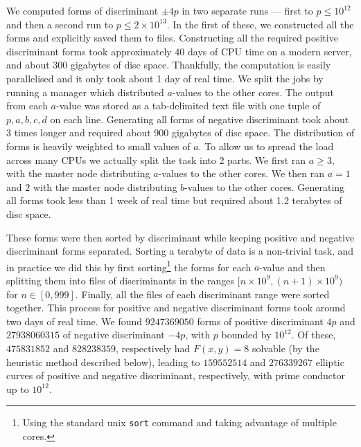 We computed forms of discriminant $\pm 4p$ in two separate runs --- first to $p\leq 10^{12}$ and then a second run to $p 
\leq 2\times 10^{13}$. In the first of these, we constructed all the forms and explicitly saved them to files. 
Constructing all the required positive discriminant forms took approximately 40 days of CPU time on a modern server, and 
about 300 gigabytes of disc space. Thankfully, the computation is easily parallelised and it only took about 1 day of 
real time. We split the jobs by running a manager which distributed $a$-values to the other cores. The output from each 
$a$-value was stored as a tab-delimited text file with one tuple of $p,a,b,c,d$ on each line. Generating all forms of 
negative discriminant took about 3 times longer and required about 900 gigabytes of disc space. The distribution of 
forms is heavily weighted to small values of $a$. To allow us to spread the load across many CPUs we actually split the 
task into 2 parts. We first ran $a \geq 3$, with the master node distributing $a$-values to the other cores. We then ran 
$a=1$ and $2$ with the master node distributing $b$-values to the other cores. Generating all forms took less than 1 week of real time but required about 1.2 terabytes of 
disc space. 

These forms were then sorted by discriminant while keeping positive and negative discriminant forms separated. Sorting 
a terabyte of data is a non-trivial task, and in practice we did this by first sorting\footnote{Using the standard unix 
\texttt{sort} command and taking advantage of multiple cores.} the forms for each $a$-value and then splitting them into 
files of discriminants in the ranges $[n \times 10^9, (n+1)\times 10^9)$ for $n\in[0,999]$. Finally, all the files of 
each discriminant range were sorted together. This process for positive and negative discriminant forms took around two days of real 
time. We found $9247369050$ forms of positive discriminant $4p$  and  $27938060315$ of negative discriminant $-4p$, with $p$
bounded by $10^{12}$. Of these, $475831852$ and $828238359$, respectively had $F(x,y)=8$ solvable (by the 
heuristic method described below), leading to $159552514$ and $276339267$ elliptic curves of positive and negative 
discriminant, respectively, with prime conductor up to $10^{12}$.

